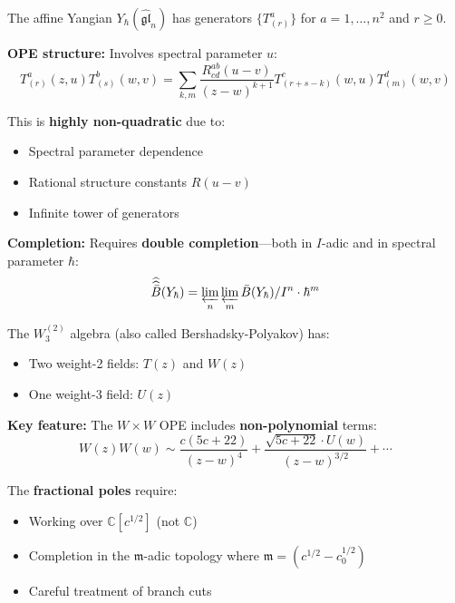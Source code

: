 \begin{example}
\label{ex:yangian-completion}

The affine Yangian $Y_\hbar(\widehat{\mathfrak{gl}}_n)$ has generators $\{T^a_{(r)}\}$ for $a = 1, \ldots, n^2$ and $r \geq 0$.

\textbf{OPE structure:} Involves spectral parameter $u$:
$$T^a_{(r)}(z, u) T^b_{(s)}(w, v) = \sum_{k,m} \frac{R^{ab}_{cd}(u-v)}{(z-w)^{k+1}} T^c_{(r+s-k)}(w,u) T^d_{(m)}(w,v)$$

This is \textbf{highly non-quadratic} due to:
\begin{itemize}
\item Spectral parameter dependence
\item Rational structure constants $R(u-v)$
\item Infinite tower of generators
\end{itemize}

\textbf{Completion:} Requires \textbf{double completion}---both in $I$-adic and in spectral parameter $\hbar$:
$$\widehat{\widehat{\bar{B}}}(Y_\hbar) = \varprojlim_n \varprojlim_m \bar{B}(Y_\hbar)/I^n \cdot \hbar^m$$
\end{example}

\begin{example}
\label{ex:bp-algebra}

The $W_3^{(2)}$ algebra (also called Bershadsky-Polyakov) has:
\begin{itemize}
\item Two weight-2 fields: $T(z)$ and $W(z)$
\item One weight-3 field: $U(z)$
\end{itemize}

\textbf{Key feature:} The $W \times W$ OPE includes \textbf{non-polynomial} terms:
$$W(z)W(w) \sim \frac{c(5c+22)}{(z-w)^4} + \frac{\sqrt{5c+22} \cdot U(w)}{(z-w)^{3/2}} + \cdots$$

The \textbf{fractional poles} require:
\begin{itemize}
\item Working over $\mathbb{C}[c^{1/2}]$ (not $\mathbb{C}$)
\item Completion in the $\mathfrak{m}$-adic topology where $\mathfrak{m} = (c^{1/2} - c_0^{1/2})$
\item Careful treatment of branch cuts
\end{itemize}
\end{example}


